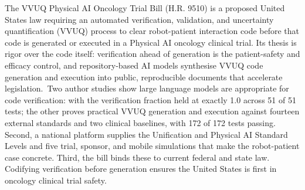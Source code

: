 
The VVUQ Physical AI Oncology Trial Bill (H.R. 9510) is a proposed United States law requiring an automated verification, validation, and uncertainty quantification (VVUQ) process to clear robot-patient interaction code before that code is generated or executed in a Physical AI oncology clinical trial. Its thesis is rigor over the code itself: verification ahead of generation is the patient-safety and efficacy control, and repository-based AI models synthesise VVUQ code generation and execution into public, reproducible documents that accelerate legislation.\ Two author studies show large language models are appropriate for code verification: with the verification fraction held at exactly 1.0 across 51 of 51 tests; the other proves practical VVUQ generation and execution against fourteen external standards and two clinical baselines, with 172 of 172 tests passing. Second, a national platform supplies the Unification and Physical AI Standard Levels and five trial, sponsor, and mobile simulations that make the robot-patient case concrete. Third, the bill binds these to current federal and state law. Codifying verification before generation ensures the United States is first in oncology clinical trial safety.
